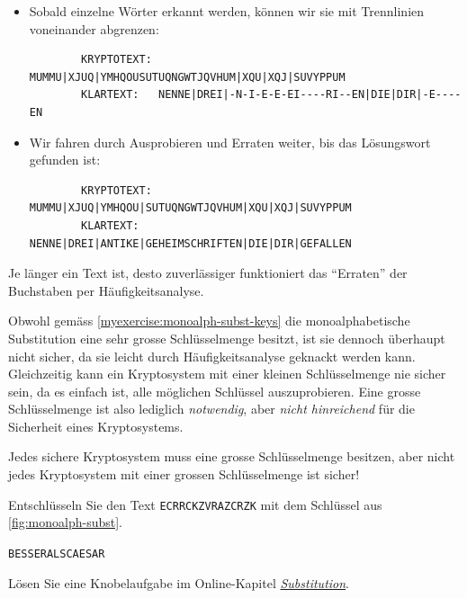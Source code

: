 \begin{myexample}
\begin{itemize}
\begin{verbatim}
		KRYPTOTEXT: MUMMUXJUQYMHQOUSUTUQNGWTJQVHUMXQUXQJSUVYPPUM
		KLARTEXT:   NENNEDREI-N-I-E-E-EI----RI--ENDIEDIR-E----EN
    \end{verbatim}
		\item Sobald einzelne Wörter erkannt werden, können wir sie mit Trennlinien voneinander abgrenzen:
		      \begin{verbatim}
		KRYPTOTEXT: MUMMU|XJUQ|YMHQOUSUTUQNGWTJQVHUM|XQU|XQJ|SUVYPPUM
		KLARTEXT:   NENNE|DREI|-N-I-E-E-EI----RI--EN|DIE|DIR|-E----EN
	\end{verbatim}
		\item Wir fahren durch Ausprobieren und Erraten weiter, bis das Lösungswort gefunden ist:
		      \begin{verbatim}
		KRYPTOTEXT: MUMMU|XJUQ|YMHQOU|SUTUQNGWTJQVHUM|XQU|XQJ|SUVYPPUM
		KLARTEXT:   NENNE|DREI|ANTIKE|GEHEIMSCHRIFTEN|DIE|DIR|GEFALLEN
	\end{verbatim}
	\end{itemize}
	Je länger ein Text ist, desto zuverlässiger funktioniert das \enquote{Erraten} der Buchstaben per Häufigkeitsanalyse.
\end{myexample}

\begin{myremark}
	Obwohl gemäss \cref{myexercise:monoalph-subst-keys} die monoalphabetische Substitution eine sehr grosse Schlüsselmenge besitzt, ist sie dennoch überhaupt nicht sicher, da sie leicht durch Häufigkeitsanalyse geknackt werden kann.
	Gleichzeitig kann ein Kryptosystem mit einer kleinen Schlüsselmenge nie sicher sein, da es einfach ist, alle möglichen Schlüssel auszuprobieren.
	Eine grosse Schlüsselmenge ist also lediglich \emph{notwendig}, aber \emph{nicht hinreichend} für die Sicherheit eines Kryptosystems.

	\par
	Jedes sichere Kryptosystem muss eine grosse Schlüsselmenge besitzen, aber nicht jedes Kryptosystem mit einer grossen Schlüsselmenge ist sicher!
\end{myremark}

\begin{myexercise}
	Entschlüsseln Sie den Text \texttt{ECRRCKZVRAZCRZK} mit dem Schlüssel aus \cref{fig:monoalph-subst}.
	\begin{myanswer}
		\texttt{BESSERALSCAESAR}
	\end{myanswer}
\end{myexercise}

\begin{mychallenge}
	Lösen Sie eine Knobelaufgabe im Online-Kapitel \emph{\href{https://cryptbreaker.marcwidmer.xyz/problems/substitution}{Substitution}}.
\end{mychallenge}